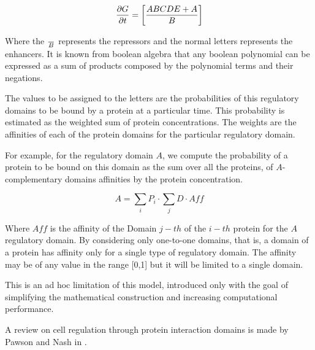 \begin{equation}
\frac{\partial{G}}{\partial t} = \left[ ABCDE + A\over{B} \right]
\end{equation}

Where the $\over{B}$ represents the repressors and the normal letters represents
the enhancers. It is known from boolean algebra that any boolean polynomial can
be expressed as a sum of products composed by the polynomial terms and their
negations.

The values to be assigned to the letters are the probabilities of this
regulatory domains to be bound by a protein at a particular time. This probability
is estimated as the weighted sum of protein concentrations. The weights are the
affinities of each of the protein domains for the particular regulatory domain.

For example, for the regulatory domain $A$, we compute the probability of a
protein to be bound on this domain as the sum over all the proteins, of
$A$-complementary domains affinities by the protein concentration.


\begin{equation}
A = \sum_i P_i \cdot \sum_j D  \cdot Aff
\end{equation}

Where $Aff$ is the affinity of the Domain $j-th$ of the $i-th$ protein for the
$A$ regulatory domain. By considering only one-to-one domains, that is, a domain
of a protein has affinity only for a single type of regulatory domain. The affinity
may be of any value in the range [0,1] but it will be limited to a single domain.

This is an ad hoc limitation of this model, introduced only with the goal of simplifying
the mathematical construction and increasing computational performance.


A review on cell regulation through protein interaction domains is made by
Pawson and Nash in \cite{Pawson2003}.


